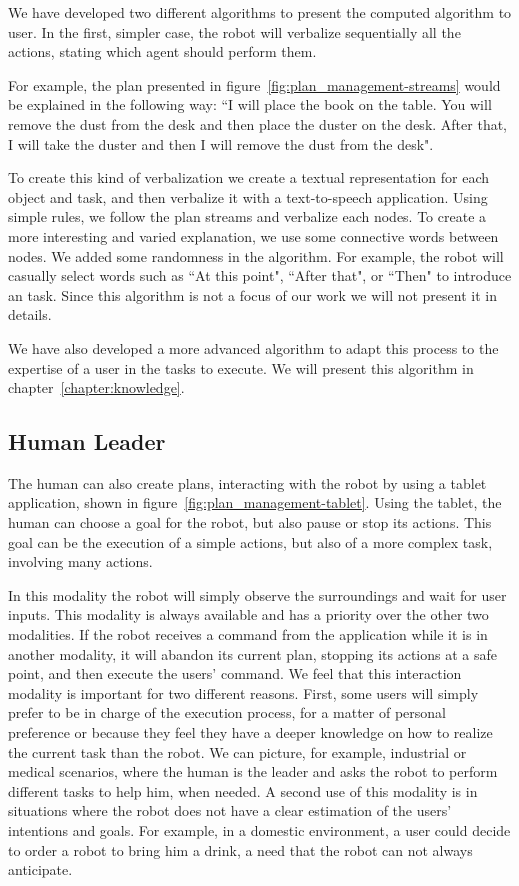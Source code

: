 We have developed two different algorithms to present the computed algorithm to user. In the first, simpler case, the robot will verbalize sequentially all the actions, stating which agent should perform them. 

For example, the plan presented in figure~\ref{fig:plan_management-streams} would be explained in the following way: ``I will place the book on the table. You will remove the dust from the desk and then place the duster on the desk. After that, I will take the duster and then I will remove the dust from the desk".

To create this kind of verbalization we create a textual representation for each object and task, and then verbalize it with a text-to-speech application. Using simple rules, we follow the plan streams and verbalize each nodes. To create a more interesting and varied explanation, we use some connective words between nodes. We added some randomness in the algorithm. For example, the robot will casually select words such as ``At this point", ``After that", or ``Then" to introduce an task. Since this algorithm is not a focus of our work we will not present it in details.

 We have also developed a more advanced algorithm to adapt this process to the expertise of a user in the tasks to execute. We will present this algorithm in chapter~\ref{chapter:knowledge}.

\subsection{Human Leader}
The human can also create plans, interacting with the robot by using a
tablet application, shown in figure~\ref{fig:plan_management-tablet}. Using the tablet, the human can choose a goal for the robot, but also pause or stop its actions. This goal can be the execution of a simple actions, but also of a more complex task, involving many actions.


In this modality the robot  will simply observe the surroundings and wait for user inputs. This modality is always available and has a priority over
the other two modalities. If the robot receives a command from the
application while it is in another modality, it will abandon its current
plan, stopping its actions at a safe point, and then execute the users'
command. We feel that this interaction modality is important for two
different reasons.  First, some users will simply prefer to be in
charge of the execution process, for a matter of personal preference or because they
feel they have a deeper knowledge on how to realize the current task
than the robot. We can picture, for example, industrial or medical
scenarios, where the human is the leader and asks the robot to perform
different tasks to help him, when needed. A second use of this modality is in situations where
the robot does not have  a clear estimation of the users' intentions and
goals. For example, in a domestic environment, a user could decide to
order a robot to bring him a drink, a need that the robot can not always anticipate.

